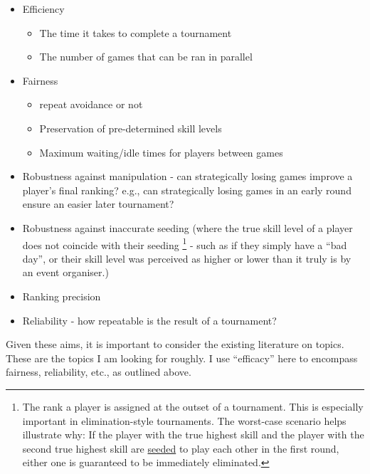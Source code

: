 \documentclass[a4,11pt,twoside,final]{article}
\begin{document}
\begin{enumerate}
\begin{itemize}
\item Efficiency
\begin{itemize}
\item The time it takes to complete a tournament
\item The number of games that can be ran in parallel
\end{itemize}
\item Fairness
\begin{itemize}
\item repeat avoidance or not
\item Preservation of pre-determined skill levels
\item Maximum waiting/idle times for players between games
\end{itemize}
\item Robustness against manipulation - can strategically losing games improve a
player's final ranking? e.g., can strategically losing games in an early
round ensure an easier later tournament?
\item Robustness against inaccurate seeding (where the true skill level of a
player does not coincide with their seeding \footnote{The rank a player is
assigned at the outset of a tournament. This is especially important in
elimination-style tournaments. The worst-case scenario helps illustrate
why: If the player with the true highest skill and the player with the
second true highest skill are \uline{seeded} to play each other in the first round,
either one is guaranteed to be immediately eliminated.} - such as if they
simply have a ``bad day'', or their skill level was perceived as higher or
lower than it truly is by an event organiser.)
\item Ranking precision
\item Reliability - how repeatable is the result of a tournament?
\end{itemize}
\end{enumerate}

Given these aims, it is important to consider the existing literature on topics.
These are the topics I am looking for roughly. I use ``efficacy'' here to
encompass fairness, reliability, etc., as outlined above.
\end{document}
